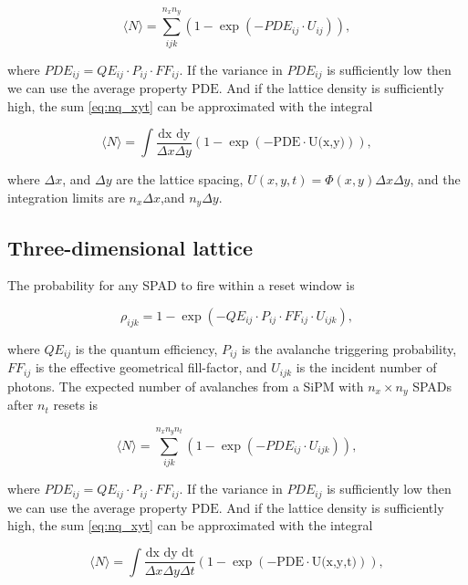 \documentclass[main.tex]{subfiles} %
\begin{document}
\begin{equation}\label{eq:nq_xyt}
    \langle N \rangle = \sum^{n_x n_y}_{ijk} \left(1-\exp{\left(-PDE_{ij}\cdot U_{ij}\right)} \right),
\end{equation}

where $PDE_{ij} = QE_{ij}\cdot P_{ij}\cdot FF_{ij}$. If the variance in $PDE_{ij}$ is sufficiently low then we can use the average property $\text{PDE}$. And if the lattice density is sufficiently high, the sum \ref{eq:nq_xyt} can be approximated with the integral

\begin{equation}\label{eq:iq_xyt}
    \langle N \rangle = \int \frac{\text{dx dy}}{\Delta x \Delta y} \left(1-\exp{\left(-\text{PDE}\cdot \text{U(x,y)}\right)}\right),
\end{equation}

where $\Delta x$, and $\Delta y$ are the lattice spacing, $U(x,y,t) = \Phi(x,y) \Delta x \Delta y$, and the integration limits are $n_x\Delta x$,and $n_y\Delta y$.

\subsection{Three-dimensional lattice}

The probability for any SPAD to fire within a reset window is 

\begin{equation}
    \rho_{ijk} = 1-\exp{\left(-QE_{ij}\cdot P_{ij}\cdot FF_{ij}\cdot U_{ijk}\right)},
\end{equation}

where $QE_{ij}$ is the quantum efficiency, $P_{ij}$ is the avalanche triggering probability, $FF_{ij}$ is the effective geometrical fill-factor, and $U_{ijk}$ is the incident number of photons. The expected number of avalanches from a SiPM with $n_x \times n_y$ SPADs after $n_t$ resets is

\begin{equation}\label{eq:nq_xyt}
    \langle N \rangle = \sum^{n_x n_y n_t}_{ijk} \left(1-\exp{\left(-{PDE}_{ij}\cdot U_{ijk}\right)} \right),
\end{equation}

where $PDE_{ij} = QE_{ij}\cdot P_{ij}\cdot FF_{ij}$. If the variance in $PDE_{ij}$ is sufficiently low then we can use the average property $\text{PDE}$. And if the lattice density is sufficiently high, the sum \ref{eq:nq_xyt} can be approximated with the integral

\begin{equation}\label{eq:iq_xyt}
    \langle N \rangle = \int \frac{\text{dx dy dt}}{\Delta x \Delta y \Delta t} \left(1-\exp{\left(-\text{PDE}\cdot \text{U(x,y,t)}\right)}\right),
\end{equation}
\end{document}
